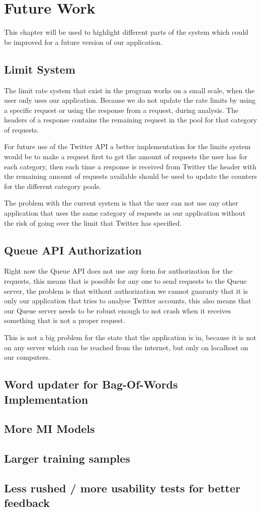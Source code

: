 \chapter{Future Work}\label{fwork}
This chapter will be used to highlight different parts of the system which could
be improved for a future version of our application.

\section{Limit System}
The limit rate system that exist in the program works on a small scale, when the
user only uses our application. Because we do not update the rate limits
by using a specific request or using the response from a
request, during analysis.
The headers of a response contains the remaining request in the pool for that
category of requests. \nl

For future use of the Twitter \ac{API} a better implementation for the limits
system would be to make a request first to get the amount of requests the user
has for each category, then each time a response is received from Twitter the
header with the remaining amount of requests available should be used to update
the counters for the different category pools.
\nl

The problem with the current system is that the user can not use any other
application that uses the same category of requests as our application without
the risk of going over the limit that Twitter has specified.

\section{Queue API Authorization}
Right now the Queue API does not use any form for authorization for the
requests, this means that is possible for any one to send requests to the
Queue server, the problem is that without authorization we cannot guaranty that
it is only our application that tries to analyse Twitter accounts, this also
means that our Queue server needs to be robust enough to not crash when it
receives something that is not a proper request. \nl

This is not a big problem for the state that the application is in, because it
is not on any server which can be reached from the internet, but only on
localhost on our computers. 

\section{Word updater for Bag-Of-Words Implementation}

\section{More MI  Models}

\section{Larger training samples}

\section{Less rushed / more usability tests for better feedback}
